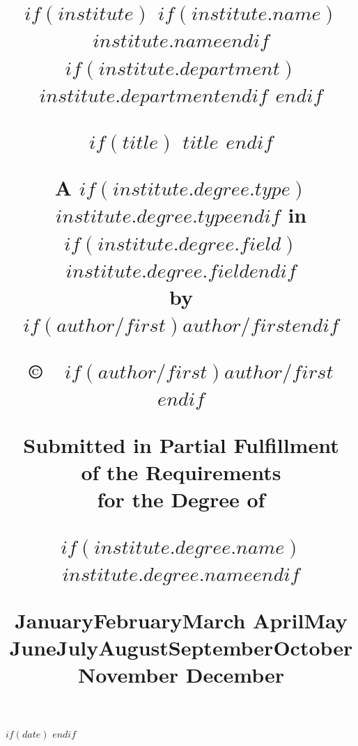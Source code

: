 \usepackage{advdate}
$if(date)$
\SetDate[$date$]
\FixDate
$endif$

\newcommand{\longmonth}{
    \ifcase \the\month \or January\or February\or March\or %
        April\or May \or June\or July\or August\or September\or October\or November\or %
        December
    \fi
}

\title{
    \normalsize
    \vspace*{-0.25in}
    \begin{center}
        $if(institute)$
        $if(institute.name)$$institute.name$$endif$\\
            $if(institute.department)$$institute.department$$endif$
        $endif$

                \vfill

            $if(title)$
                {
                        \linespread{2}\bfseries\uppercase\expandafter{$title$}
                    }
            $endif$

                \vfill

                A $if(institute.degree.type)$$institute.degree.type$$endif$ in\\
            $if(institute.degree.field)$$institute.degree.field$$endif$\\
                by\\
            $if(author/first)$$author/first$$endif$

                \vfill

                \copyright\ \the\year~$if(author/first)$$author/first$$endif$

                \vfill

                Submitted in Partial Fulfillment\\
                of the Requirements\\
                for the Degree of

                \vfill

            $if(institute.degree.name)$$institute.degree.name$$endif$

        \vfill

        \longmonth \the\year
    \end{center}
}

\date{ }
